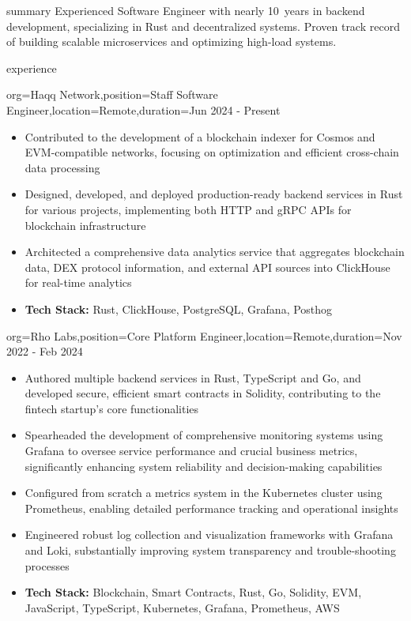 \documentclass{resume}
\begin{document}
\makeheader

\begin{ResumeSection}{summary}
    Experienced Software Engineer with nearly 10~years in backend development, specializing in Rust and decentralized systems. Proven track record of building scalable microservices and optimizing high-load systems.
\end{ResumeSection}

\begin{ResumeSection}{experience}
\begin{ResumeSubsection}{org=Haqq Network,position=Staff Software Engineer,location=Remote,duration=Jun 2024 - Present}
        \begin{itemize}
            \item Contributed to the development of a blockchain indexer for Cosmos and EVM-compatible networks, focusing on optimization and efficient cross-chain data processing
            \item Designed, developed, and deployed production-ready backend services in Rust for various projects, implementing both HTTP and gRPC APIs for blockchain infrastructure
            \item Architected a comprehensive data analytics service that aggregates blockchain data, DEX protocol information, and external API sources into ClickHouse for real-time analytics
            \item \textbf{Tech Stack:} Rust, ClickHouse, PostgreSQL, Grafana, Posthog
        \end{itemize}
    \end{ResumeSubsection}

    \begin{ResumeSubsection}{org=Rho Labs,position=Core Platform Engineer,location=Remote,duration=Nov 2022 - Feb 2024}
        \begin{itemize}
            \item Authored multiple backend services in Rust, TypeScript and Go, and developed secure, efficient smart contracts in Solidity, contributing to the fintech startup's core functionalities
            \item Spearheaded the development of comprehensive monitoring systems using Grafana to oversee service performance and crucial business metrics, significantly enhancing system reliability and decision\mbox{-}making capabilities
            \item Configured from scratch a metrics system in the Kubernetes cluster using Prometheus, enabling detailed performance tracking and operational insights
            \item Engineered robust log collection and visualization frameworks with Grafana and Loki, substantially improving system transparency and trouble\mbox{-}shooting processes
            \item \textbf{Tech Stack:} Blockchain, Smart Contracts, Rust, Go, Solidity, EVM, JavaScript, TypeScript, Kubernetes, Grafana, Prometheus, AWS
        \end{itemize}
    \end{ResumeSubsection}


\end{ResumeSection}
\end{document}
